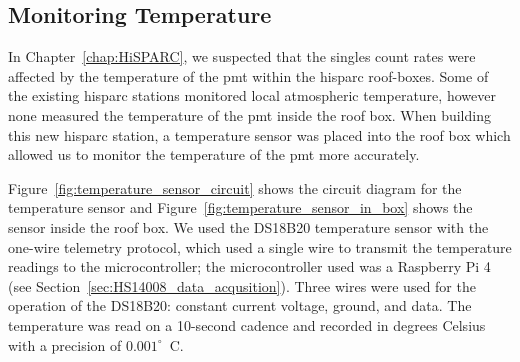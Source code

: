 \subsection{Monitoring Temperature}

In Chapter~\ref{chap:HiSPARC}, we suspected that the singles count rates were affected by the temperature of the \gls{pmt} within the \gls{hisparc} roof-boxes. Some of the existing \gls{hisparc} stations monitored local atmospheric temperature, however none measured the temperature of the \gls{pmt} inside the roof box. When building this new \gls{hisparc} station, a temperature sensor was placed into the roof box which allowed us to monitor the temperature of the \gls{pmt} more accurately. %

Figure~\ref{fig:temperature_sensor_circuit} shows the circuit diagram for the temperature sensor and Figure~\ref{fig:temperature_sensor_in_box} shows the sensor inside the roof box. We used the DS18B20 temperature sensor with the one-wire telemetry protocol, which used a single wire to transmit the temperature readings to the microcontroller; the microcontroller used was a Raspberry Pi 4 (see Section~\ref{sec:HS14008_data_acqusition}). Three wires were used for the operation of the DS18B20: constant current voltage, ground, and data. The temperature was read on a 10-second cadence and recorded in degrees Celsius with a precision of $0.001^{\circ}$~C. 


